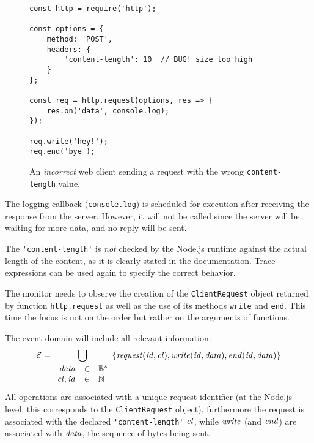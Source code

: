 \begin{figure}[h]
\begin{lstlisting}
const http = require('http');

const options = {
	method: 'POST',
	headers: {
		'content-length': 10  // BUG! size too high
	}
};

const req = http.request(options, res => {
	res.on('data', console.log);
});

req.write('hey!');
req.end('bye');
\end{lstlisting}
\caption{An \emph{incorrect} web client sending a request with the wrong \texttt{content-length} value.}
\label{lst:client}
\end{figure}

The logging callback (\lstinline{console.log}) is scheduled for execution after receiving the response from the server.
However, it will not be called since the server will be waiting for more data, and no reply will be sent.

The \lstinline{'content-length'} is \emph{not} checked by the Node.js runtime against the actual length of the content, as it is clearly stated in the documentation.
Trace expressions can be used again to specify the correct behavior.

The monitor needs to observe the creation of the \lstinline{ClientRequest} object returned by function \lstinline{http.request} as well as the use of its methods \lstinline{write} and \lstinline{end}.
This time the focus is not on the order but rather on the arguments of functions.

The event domain will include all relevant information:
\[ \mathcal{E} = \bigcup_{\begin{array}{rcl}\mathit{data}&\in&\mathbb{B}^*\\\mathit{cl},\mathit{id} &\in& \mathbb{N}\end{array}} \{ \mathit{request}(\mathit{id},\mathit{cl}), \mathit{write}(\mathit{id}, \mathit{data}), \mathit{end}(\mathit{id}, \mathit{data}) \} \]
All operations are associated with a unique request identifier (at the Node.js level, this corresponds to the \lstinline{ClientRequest} object), furthermore the request is associated with the declared \lstinline{'content-length'} \(\mathit{cl}\), while \(\mathit{write}\) (and \(\mathit{end}\)) are associated with \(\mathit{data}\),
the sequence of bytes being sent.



